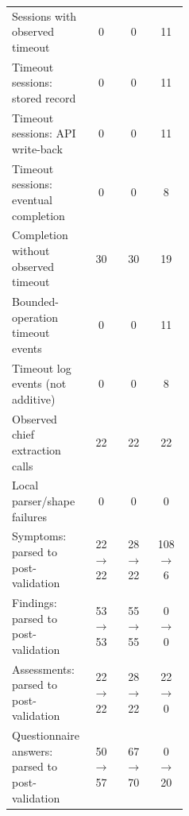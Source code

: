 \begin{tabular}{p{0.44\linewidth}ccc}
Sessions with observed timeout & 0 & 0 & 11 \\[3pt]
Timeout sessions: stored record & 0 & 0 & 11 \\[3pt]
Timeout sessions: API write-back & 0 & 0 & 11 \\[3pt]
Timeout sessions: eventual completion & 0 & 0 & 8 \\[3pt]
Completion without observed timeout & 30 & 30 & 19 \\[3pt]
Bounded-operation timeout events & 0 & 0 & 11 \\[3pt]
Timeout log events (not additive) & 0 & 0 & 8 \\[3pt]
Observed chief extraction calls & 22 & 22 & 22 \\[3pt]
Local parser/shape failures & 0 & 0 & 0 \\[3pt]
Symptoms: parsed to post-validation & 22 $\to$ 22 & 28 $\to$ 22 & 108 $\to$ 6 \\[3pt]
Findings: parsed to post-validation & 53 $\to$ 53 & 55 $\to$ 55 & 0 $\to$ 0 \\[3pt]
Assessments: parsed to post-validation & 22 $\to$ 22 & 28 $\to$ 22 & 22 $\to$ 0 \\[3pt]
Questionnaire answers: parsed to post-validation & 50 $\to$ 57 & 67 $\to$ 70 & 0 $\to$ 20 \\[3pt]
\hline
\end{tabular}
